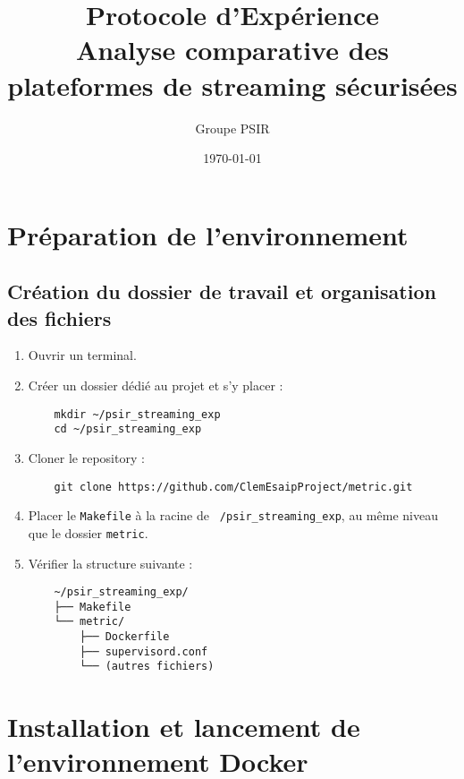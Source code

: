 \documentclass[a4paper,12pt]{article}
\title{Protocole d'Expérience\\
Analyse comparative des plateformes de streaming sécurisées}
\author{Groupe PSIR}
\date{\today}
\begin{document}
\maketitle

\tableofcontents
\newpage

\section{Préparation de l’environnement}

\subsection{Création du dossier de travail et organisation des fichiers}
\begin{enumerate}[label=\alph*)]
    \item Ouvrir un terminal.
    \item Créer un dossier dédié au projet et s'y placer :
    \begin{verbatim}
    mkdir ~/psir_streaming_exp
    cd ~/psir_streaming_exp
    \end{verbatim}
    \item Cloner le repository :
    \begin{verbatim}
    git clone https://github.com/ClemEsaipProject/metric.git
    \end{verbatim}
    \item Placer le \texttt{Makefile} à la racine de \texttt{~/psir_streaming_exp}, au même niveau que le dossier \texttt{metric}.
    \item Vérifier la structure suivante :
    \begin{verbatim}
    ~/psir_streaming_exp/
    ├── Makefile
    └── metric/
        ├── Dockerfile
        ├── supervisord.conf
        └── (autres fichiers)
    \end{verbatim}
\end{enumerate}

\section{Installation et lancement de l’environnement Docker}
\end{document}
